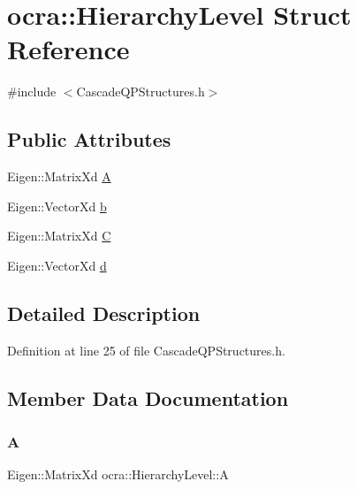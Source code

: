 \hypertarget{structocra_1_1HierarchyLevel}{}\section{ocra\+:\+:Hierarchy\+Level Struct Reference}
\label{structocra_1_1HierarchyLevel}


{\ttfamily \#include $<$Cascade\+Q\+P\+Structures.\+h$>$}

\subsection*{Public Attributes}
\begin{DoxyCompactItemize}
\item 
Eigen\+::\+Matrix\+Xd \hyperlink{structocra_1_1HierarchyLevel_a19bc3f9c063348621857c7bcc5c391c7}{A}
\item 
Eigen\+::\+Vector\+Xd \hyperlink{structocra_1_1HierarchyLevel_aedcf136bbf54aa0ff910b3a3ce3d43be}{b}
\item 
Eigen\+::\+Matrix\+Xd \hyperlink{structocra_1_1HierarchyLevel_ad33118f78c391492062c6b3687c2e20d}{C}
\item 
Eigen\+::\+Vector\+Xd \hyperlink{structocra_1_1HierarchyLevel_ad1c6f525af33862743514fd5cf3e8c76}{d}
\end{DoxyCompactItemize}


\subsection{Detailed Description}


Definition at line 25 of file Cascade\+Q\+P\+Structures.\+h.



\subsection{Member Data Documentation}
\hypertarget{structocra_1_1HierarchyLevel_a19bc3f9c063348621857c7bcc5c391c7}{}\label{structocra_1_1HierarchyLevel_a19bc3f9c063348621857c7bcc5c391c7} 
\subsubsection{\texorpdfstring{A}{A}}
{\footnotesize\ttfamily Eigen\+::\+Matrix\+Xd ocra\+::\+Hierarchy\+Level\+::A}



